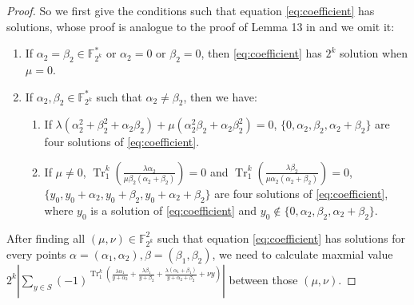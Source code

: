 \documentclass{article}
\newcommand{\F}{\mathbb{F}}
\newcommand{\0}{\textbf{0}}
\newcommand{\1}{\textbf{1}}
\newcommand{\TRACE}{\operatorname{Tr}_1^k}
\theoremstyle{plain}
\theoremstyle{nonumberplain}
\begin{document}
\begin{proof}
    So we first give the conditions such that equation \eqref{eq:coefficient} has solutions, 
    whose proof is analogue to the proof of Lemma 13 in \cite{tang2022invfunc} and we omit it: 
    \begin{enumerate}[label=\arabic{*})]
        \item If $ \alpha_2=\beta_2\in\F_{2^k}^* $ or $ \alpha_2=0 $ or $ \beta_2=0 $, 
        then \eqref{eq:coefficient} has $ 2^k $ solution when $ \mu = 0 $.
        \item If $ \alpha_2,\beta_2\in\F_{2^k}^* $ such that $ \alpha_2\ne\beta_2 $, then we have: 
        \begin{enumerate}
            \item If $ \lambda(\alpha_2^2+\beta_2^2+\alpha_2\beta_2)+\mu(\alpha_2^2\beta_2+\alpha_2\beta_2^2)=0 $, 
            $ \{0,\alpha_2,\beta_2,\alpha_2+\beta_2\} $ are four solutions of \eqref{eq:coefficient}.
            \item If $ \mu\ne 0 $, $ \TRACE\left(\frac{\lambda\alpha_2}{\mu\beta_2(\alpha_2+\beta_2)}\right)=0 $ and 
            $ \TRACE\left(\frac{\lambda\beta_2}{\mu\alpha_2(\alpha_2+\beta_2)}\right)=0 $, 
            $ \{y_0,y_0+\alpha_2,y_0+\beta_2,y_0+\alpha_2+\beta_2\} $ are four solutions of \eqref{eq:coefficient}, where $ y_0 $ is a solution of \eqref{eq:coefficient} 
            and $ y_0\notin\{0,\alpha_2,\beta_2,\alpha_2+\beta_2\} $. 
        \end{enumerate}
    \end{enumerate} 
    After finding all $ (\mu,\nu)\in\F_{2^k}^2 $ such that equation \eqref{eq:coefficient} has solutions for every points 
    $ \alpha=(\alpha_1,\alpha_2),\beta=(\beta_1,\beta_2) $, we need to calculate maxmial value 
    $ 2^k\left\lvert \sum_{y\in S}(-1)^{\TRACE\left(\frac{\lambda\alpha_1}{y+\alpha_2}+\frac{\lambda\beta_1}{y+\beta_2}+\frac{\lambda(\alpha_1+\beta_1)}{y+\alpha_2+\beta_2}+\nu y\right)} \right\rvert$ 
    between those $ (\mu,\nu) $.    
    

\end{proof}
\end{document}
